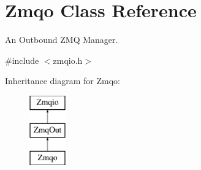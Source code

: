 \hypertarget{classZmqo}{\section{Zmqo Class Reference}
\label{classZmqo}
}


An Outbound Z\-M\-Q Manager.  




{\ttfamily \#include $<$zmqio.\-h$>$}

Inheritance diagram for Zmqo\-:\begin{figure}[H]
\begin{center}
\leavevmode
\includegraphics[height=3.000000cm]{classZmqo}
\end{center}
\end{figure}
